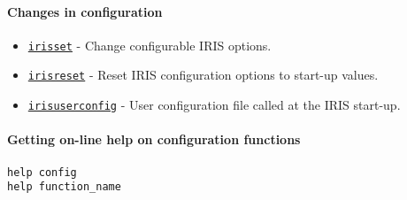 \paragraph{Changes in configuration}\label{changes-in-configuration}

\begin{itemize}
\itemsep1pt\parskip0pt
\item
  \href{config/irisset}{\texttt{irisset}} - Change configurable IRIS
  options.
\item
  \href{config/irisreset}{\texttt{irisreset}} - Reset IRIS configuration
  options to start-up values.
\item
  \href{config/irisuserconfighelp}{\texttt{irisuserconfig}} - User
  configuration file called at the IRIS start-up.
\end{itemize}

\paragraph{Getting on-line help on configuration
functions}\label{getting-on-line-help-on-configuration-functions}

\begin{verbatim}
help config
help function_name
\end{verbatim}



